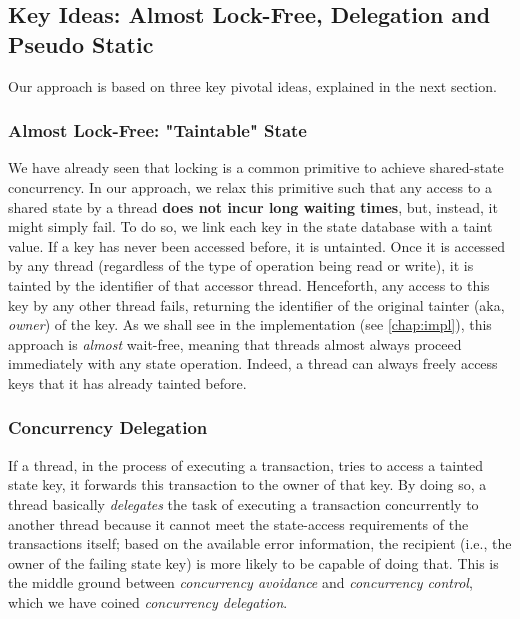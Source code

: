 \subsection{Key Ideas: Almost Lock-Free, Delegation and Pseudo Static}

Our approach is based on three key pivotal ideas, explained
in the next section.

\subsubsection{Almost Lock-Free: "Taintable" State}\label{chapt_approach:subsubsec:taintable_state}

We have already seen that locking is a common primitive to achieve shared-state concurrency. In our
approach, we relax this primitive such that any access to a shared state by a thread \textbf{does
not incur long waiting times}, but, instead, it might simply fail. To do so, we link each key in the
state database with a taint value. If a key has never been accessed before, it is untainted. Once it
is accessed by any thread (regardless of the type of operation being read or write), it is tainted by the identifier of that
accessor thread. Henceforth, any access to this key by any other thread fails, returning the
identifier of the original tainter (aka, \textit{owner}) of the key. As we shall see in the
implementation (see \ref{chap:impl}), this approach is \textit{almost} wait-free, meaning that
threads almost always proceed immediately with any state operation. Indeed, a thread can always
freely access keys that it has already tainted before.

\subsubsection{Concurrency Delegation}

If a thread, in the process of executing a transaction, tries to access a tainted state key, it
forwards this transaction to the owner of that key. By doing so, a thread basically
\textit{delegates} the task of executing a transaction concurrently to another thread
because it cannot meet the state-access requirements of the transactions itself; based on the
available error information, the recipient (i.e., the owner of the failing state key) is more likely
to be capable of doing that. This is the middle ground between \textit{concurrency avoidance} and
\textit{concurrency control}, which we have coined \textit{concurrency delegation}.

